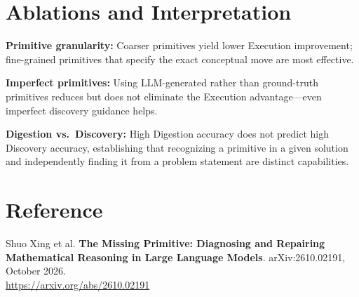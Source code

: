 \documentclass[10pt,twocolumn]{article}
\begin{document}
\section{Ablations and Interpretation}

\textbf{Primitive granularity:} Coarser primitives yield lower Execution improvement;
fine-grained primitives that specify the exact conceptual move are most effective.

\textbf{Imperfect primitives:} Using LLM-generated rather than ground-truth primitives
reduces but does not eliminate the Execution advantage---even imperfect discovery guidance helps.

\textbf{Digestion vs.\ Discovery:} High Digestion accuracy does not predict high Discovery
accuracy, establishing that recognizing a primitive in a given solution and independently
finding it from a problem statement are distinct capabilities.

\section*{Reference}

Shuo Xing et al.
\textbf{The Missing Primitive: Diagnosing and Repairing Mathematical Reasoning in
Large Language Models}.
arXiv:2610.02191, October 2026.\\
\url{https://arxiv.org/abs/2610.02191}
\end{document}
